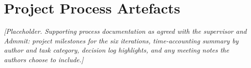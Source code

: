 \section{Project Process Artefacts}
\label{app:process}

\textit{[Placeholder. Supporting process documentation as agreed with the supervisor and Admmit: project milestones for the six iterations, time-accounting summary by author and task category, decision log highlights, and any meeting notes the authors choose to include.]}
